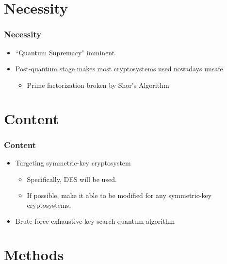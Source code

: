 \documentclass{beamer}
\begin{document}
    \section{Necessity}

    \begin{frame}
        \frametitle{Necessity}

        \begin{itemize}
            \item ``Quantum Supremacy" imminent
            \item Post-quantum stage makes most cryptosystems used nowadays unsafe
            \begin{itemize}
                \item Prime factorization broken by Shor's Algorithm
            \end{itemize}
        \end{itemize}
    \end{frame}

    \section{Content}

    \begin{frame}
        \frametitle{Content}

        \begin{itemize}
            \item Targeting symmetric-key cryptosystem
            \begin{itemize}
                \item Specifically, DES will be used.
                \item If possible, make it able to be modified for any symmetric-key cryptosystems.
            \end{itemize}
            \item Brute-force exhaustive key search quantum algorithm
        \end{itemize}
    \end{frame}

    \section{Methods}
\end{document}
